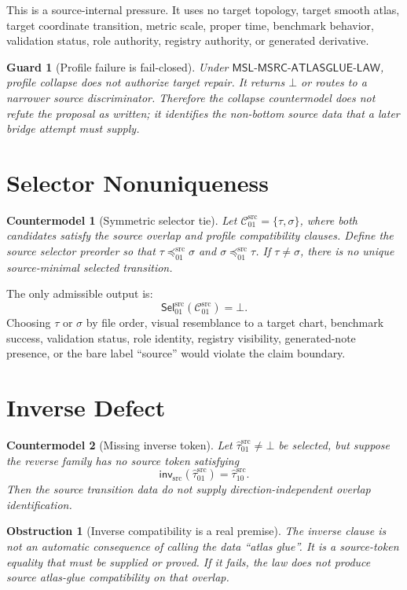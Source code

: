 \documentclass[11pt]{article}
\newcommand{\MSL}{\mathsf{MSL}\mbox{-}\mathsf{MSRC}\mbox{-}\mathsf{ATLASGLUE}\mbox{-}\mathsf{LAW}}
\newcommand{\Cand}{\mathcal{C}^{\mathrm{src}}}
\newcommand{\Sel}{\mathsf{Sel}^{\mathrm{src}}}
\newcommand{\Tau}{\widehat{\tau}^{\mathrm{src}}}
\newcommand{\Bot}{\bot}
\newtheorem{countermodel}{Countermodel}
\newtheorem{obstruction}{Obstruction}
\newtheorem{guard}{Guard}
\begin{document}
This is a source-internal pressure. It uses no target topology, target smooth
atlas, target coordinate transition, metric scale, proper time, benchmark
behavior, validation status, role authority, registry authority, or generated
derivative.

\begin{guard}[Profile failure is fail-closed]
Under \(\MSL\), profile collapse does not authorize target repair. It returns
\(\Bot\) or routes to a narrower source discriminator. Therefore the collapse
countermodel does not refute the proposal as written; it identifies the
non-bottom source data that a later bridge attempt must supply.
\end{guard}

\section{Selector Nonuniqueness}

\begin{countermodel}[Symmetric selector tie]
Let \(\Cand_{01}=\{\tau,\sigma\}\), where both candidates satisfy the source
overlap and profile compatibility clauses. Define the source selector preorder
so that \(\tau\preceq^{\mathrm{src}}_{01}\sigma\) and
\(\sigma\preceq^{\mathrm{src}}_{01}\tau\). If \(\tau\neq\sigma\), there is no
unique source-minimal selected transition.
\end{countermodel}

The only admissible output is:
\[
  \Sel_{01}(\Cand_{01})=\Bot.
\]
Choosing \(\tau\) or \(\sigma\) by file order, visual resemblance to a target
chart, benchmark success, validation status, role identity, registry
visibility, generated-note presence, or the bare label ``source'' would
violate the claim boundary.

\section{Inverse Defect}

\begin{countermodel}[Missing inverse token]
Let \(\Tau_{01}\neq\Bot\) be selected, but suppose the reverse family has no
source token satisfying
\[
  \mathsf{inv}_{\mathrm{src}}(\Tau_{01})=\Tau_{10}.
\]
Then the source transition data do not supply direction-independent overlap
identification.
\end{countermodel}

\begin{obstruction}[Inverse compatibility is a real premise]
The inverse clause is not an automatic consequence of calling the data
``atlas glue''. It is a source-token equality that must be supplied or proved.
If it fails, the law does not produce source atlas-glue compatibility on that
overlap.
\end{obstruction}
\end{document}
